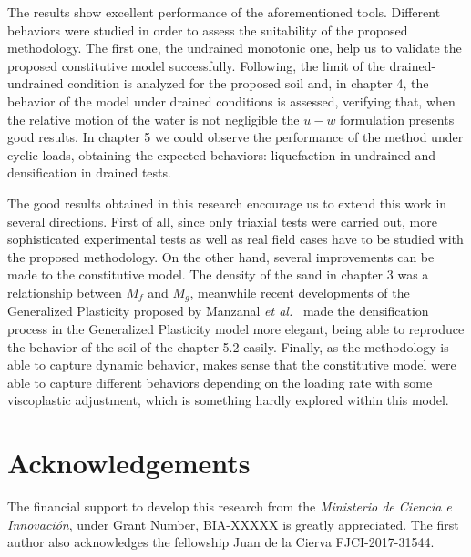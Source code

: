 \documentclass[preprint,12pt,a4paper]{elsarticle}
\begin{document}
The results show excellent performance of the aforementioned tools. Different behaviors were studied in order to assess the suitability of the proposed methodology. The first one, the undrained monotonic one, help us to validate the proposed constitutive model successfully. Following, the limit of the drained-undrained condition is analyzed for the proposed soil and, in chapter 4, the behavior of the model under drained conditions is assessed, verifying that, when the relative motion of the water is not negligible the $u-w$ formulation presents good results. In chapter 5 we could observe the performance of the method under cyclic loads, obtaining the expected behaviors: liquefaction in undrained and densification in drained tests.

The good results obtained in this research encourage us to extend this work in several directions. First of all, since only triaxial tests were carried out, more sophisticated experimental tests as well as real field cases have to be studied with the proposed methodology. On the other hand, several improvements can be made to the constitutive model. The density of the sand in chapter 3 was a relationship between $M_f$ and $M_g$, meanwhile recent developments of the Generalized Plasticity proposed by Manzanal \textit{et al.}~\cite{Manzanal2011,Manzanal2011a} made the densification process in the Generalized Plasticity model more elegant, being able to reproduce the behavior of the soil of the chapter 5.2 easily. Finally, as the methodology is able to capture dynamic behavior, makes sense that the constitutive model were able to capture different behaviors depending on the loading rate with some viscoplastic adjustment, which is something hardly explored within this model. 

\section*{Acknowledgements}
The  financial support to develop this research from the \textit{Ministerio de Ciencia e Innovaci\'on}, under Grant Number, BIA-XXXXX is greatly appreciated. The first author also acknowledges the fellowship Juan de la Cierva FJCI-2017-31544.

\appendix

\clearpage
{}
\end{document}
